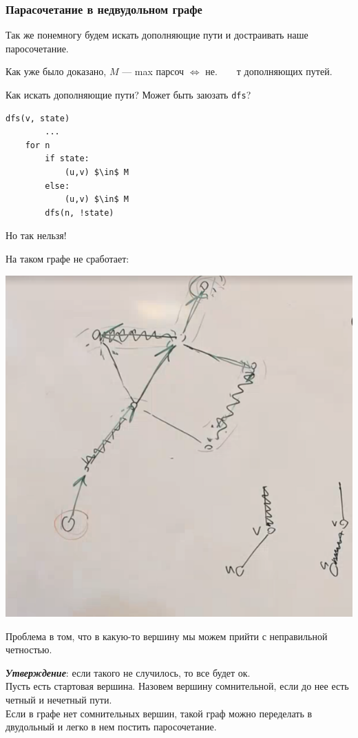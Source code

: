 \subsubsection{Парасочетание в недвудольном графе}

Так же понемногу будем искать дополняющие пути и достраивать наше паросочетание.

Как уже было доказано, $M$ --- max парсоч $\iff$ не.~~~~т дополняющих путей.

Как искать дополняющие пути? Может быть заюзать \texttt{dfs}?

\begin{lstlisting}[mathescape=true]
    dfs(v, state)
        ...
    for n
        if state:
            (u,v) $\in$ M
        else:
            (u,v) $\in$ M
        dfs(n, !state)
\end{lstlisting}


Но так нельзя!

На таком графе не сработает:

\begin{center}
    \includegraphics[scale=0.6]{img/parsoch_dfs_bad_usage}
\end{center}

Проблема в том, что в какую-то вершину мы можем прийти с неправильной четностью.

\textit{\textbf{Утверждение}}: если такого не случилось, то все будет ок.\\
Пусть есть стартовая вершина.
Назовем вершину сомнительной, если до нее есть четный и нечетный пути. \\
Если в графе нет сомнительных вершин, такой граф можно переделать в двудольный и легко в нем постить паросочетание.

